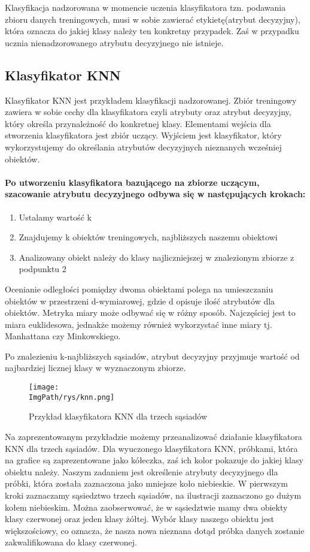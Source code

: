 \documentclass[a4paper,12pt,twoside,openany]{report}
\newcommand{\ImgPath}{.}
\begin{document}
Klasyfikacja nadzorowana w momencie uczenia klasyfikatora tzn. podawania zbioru danych treningowych, musi w sobie zawierać etykietę(atrybut decyzyjny), która oznacza do jakiej klasy należy ten konkretny przypadek. Zaś w przypadku ucznia nienadzorowanego atrybutu decyzyjnego nie istnieje.

\subsection{Klasyfikator KNN}
Klasyfikator KNN jest przykładem klasyfikacji nadzorowanej. Zbiór treningowy zawiera w sobie cechy dla klasyfikatora czyli atrybuty oraz atrybut decyzyjny, który określa przynależność do konkretnej klasy. Elementami wejścia dla stworzenia klasyfikatora jest zbiór uczący. Wyjściem jest klasyfikator, który wykorzystujemy do określania atrybutów decyzyjnych nieznanych wcześniej obiektów.

\paragraph{Po utworzeniu klasyfikatora bazującego na zbiorze uczącym, szacowanie atrybutu decyzyjnego odbywa się w następujących krokach: }
\begin{enumerate}
	\item Ustalamy wartość k
	\item Znajdujemy k obiektów treningowych, najbliższych naszemu obiektowi
	\item Analizowany obiekt należy do klasy najliczniejszej w znalezionym zbiorze z podpunktu 2
\end{enumerate}
	
Ocenianie odległości pomiędzy dwoma obiektami polega na umieszczaniu obiektów w przestrzeni d-wymiarowej, gdzie d opisuje ilość atrybutów dla obiektów. Metryka miary może odbywać się w różny sposób. Najczęściej jest to miara euklidesowa, jednakże możemy również wykorzystać inne miary tj. Manhattana czy Minkowskiego. 

Po znalezieniu k-najbliższych sąsiadów, atrybut decyzyjny przyjmuje wartość od najbardziej licznej klasy w wyznaczonym zbiorze.

\begin{figure}[H]	
	\centering
	\texttt{[image: \\ImgPath/rys/knn.png]}
	
	\caption{Przykład klasyfikatora KNN dla trzech sąsiadów}
\end{figure}

Na zaprezentowanym przykładzie możemy przeanalizować działanie klasyfikatora KNN dla trzech sąsiadów. Dla wyuczonego klasyfikatora KNN, próbkami, która na grafice są zaprezentowane jako kółeczka, zaś ich kolor pokazuje do jakiej klasy obiektu należy. Naszym zadaniem jest określenie atrybuty decyzyjnego dla próbki, która została zaznaczona jako mniejsze koło niebieskie. W pierwszym kroki zaznaczamy sąsiedztwo trzech sąsiadów, na ilustracji zaznaczono go dużym kołem niebieskim. Można zaobserwować, że w sąsiedztwie mamy dwa obiekty klasy czerwonej oraz jeden klasy żółtej. Wybór klasy naszego obiektu jest większościowy, co oznacza, że nasza nowa nieznana dotąd próbka danych zostanie zakwalifikowana do klasy czerwonej.
\end{document}
